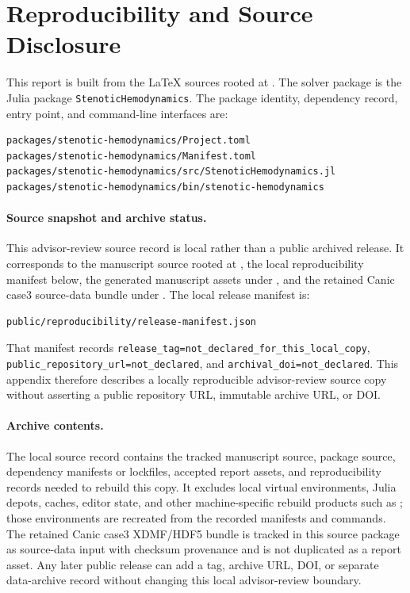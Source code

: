 \section{Reproducibility and Source Disclosure}
\label{app:code-and-ai-use}

This report is built from the \LaTeX{} sources rooted at
. The solver package is the Julia package
\texttt{StenoticHemodynamics}. The package identity, dependency record, entry
point, and command-line interfaces are:
\begin{lstlisting}[basicstyle=\ttfamily\footnotesize,breaklines=true]
packages/stenotic-hemodynamics/Project.toml
packages/stenotic-hemodynamics/Manifest.toml
packages/stenotic-hemodynamics/src/StenoticHemodynamics.jl
packages/stenotic-hemodynamics/bin/stenotic-hemodynamics
\end{lstlisting}

\paragraph*{Source snapshot and archive status.}
This advisor-review source record is local rather than a public archived
release. It corresponds to the manuscript source rooted at
, the local reproducibility manifest below, the
generated manuscript assets under , and the retained Canic
case3 source-data bundle under
. The local release manifest is:
\begin{lstlisting}[basicstyle=\ttfamily\footnotesize,breaklines=true]
public/reproducibility/release-manifest.json
\end{lstlisting}
That manifest records \texttt{release\_tag=not\_declared\_for\_this\_local\_copy},
\texttt{public\_repository\_url=not\_declared}, and
\texttt{archival\_doi=not\_declared}. This appendix therefore describes a
locally reproducible advisor-review source copy without asserting a public
repository URL, immutable archive URL, or DOI.

\paragraph*{Archive contents.}
The local source record contains the tracked manuscript source, package source,
dependency manifests or lockfiles, accepted report assets, and reproducibility
records needed to rebuild this copy. It excludes local virtual environments,
Julia depots, caches, editor state, and other machine-specific rebuild products
such as ; those environments are recreated from the recorded
manifests and commands. The retained Canic case3 XDMF/HDF5 bundle is tracked in
this source package as source-data input with checksum provenance and is not
duplicated as a report asset. Any later public release can add a tag, archive
URL, DOI, or separate data-archive record without changing this local
advisor-review boundary.

